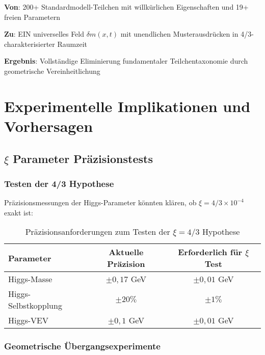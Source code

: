 \documentclass[12pt,a4paper]{article}
\newcommand{\xipar}{\ensuremath{\xi}}
\newcommand{\deltafield}{\ensuremath{\delta m}}
\newcommand{\mytimes}{\ensuremath{\times}}
\begin{document}
	\begin{tcolorbox}[colback=green!5!white,colframe=green!75!black,title=T0 Vereinheitlichungsleistung]
		\textbf{Von}: 200+ Standardmodell-Teilchen mit willkürlichen Eigenschaften und 19+ freien Parametern
		
		\textbf{Zu}: EIN universelles Feld $\deltafield(x,t)$ mit unendlichen Musterausdrücken in 4/3-charakterisierter Raumzeit
		
		\textbf{Ergebnis}: Vollständige Eliminierung fundamentaler Teilchentaxonomie durch geometrische Vereinheitlichung
	\end{tcolorbox}
	
	\section{Experimentelle Implikationen und Vorhersagen}
	\label{sec:experimentelle_implikationen}
	
	\subsection{$\xi$ Parameter Präzisionstests}
	\label{subsec:xi_praezisionstests}
	
	\subsubsection{Testen der 4/3 Hypothese}
	\label{subsubsec:testen_vier_drittel}
	
	Präzisionsmessungen der Higgs-Parameter könnten klären, ob $\xipar = 4/3 \mytimes 10^{-4}$ exakt ist:
	
	\begin{table}[htbp]
		\centering
		\begin{tabular}{lcc}
			\toprule
			\textbf{Parameter} & \textbf{Aktuelle Präzision} & \textbf{Erforderlich für $\xi$ Test} \\
			\midrule
			Higgs-Masse & $\pm 0,17$ GeV & $\pm 0,01$ GeV \\
			Higgs-Selbstkopplung & $\pm 20\%$ & $\pm 1\%$ \\
			Higgs-VEV & $\pm 0,1$ GeV & $\pm 0,01$ GeV \\
			\bottomrule
		\end{tabular}
		\caption{Präzisionsanforderungen zum Testen der $\xi = 4/3$ Hypothese}
		\label{tab:praezisionsanforderungen}
	\end{table}
	
	\subsubsection{Geometrische Übergangsexperimente}
	\label{subsubsec:geometrische_uebergaenge}
	
\end{document}
